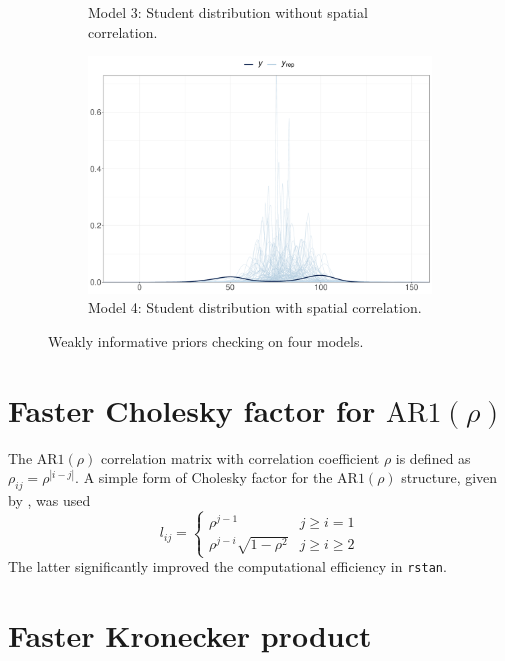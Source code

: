 \documentclass[a4paper]{article}   	%
\newcommand{\rstan}{\texttt{rstan}}
\newcommand{\AR}{\mathrm{AR}1}
\begin{document}
\begin{figure}[!htp]
\begin{subfigure}[t]{0.45\textwidth}
			\caption{Model 3: Student distribution without spatial correlation.}
		\end{subfigure}
		\begin{subfigure}[t]{0.45\textwidth}		
			\includegraphics[width=\linewidth]{Images/prior_STRand}
			\caption{Model 4: Student distribution with spatial correlation.}
		\end{subfigure}
		\caption{Weakly informative priors checking on four models. }\label{fig:priorcheck4models}
	\end{figure}
	
	
	\section{Faster Cholesky factor for $\AR(\rho)$}\label{sec:fastar1}
	
	The $\AR(\rho)$ correlation matrix with correlation coefficient $\rho$ is defined as $\rho_{ij} = \rho^{|i-j|}$. A simple form of Cholesky factor for the $\AR(\rho)$ structure, given by \textcite{Madar2015Direct}, was used 
	\begin{equation}
		l_{ij} = \begin{cases}
			\rho^{j-1} & j\geq i =1 \\
			\rho^{j-i} \sqrt{1-\rho^2} & j\geq i \geq2
		\end{cases}
	\end{equation}
	The latter significantly improved the computational efficiency in \rstan. 
	
	\section{Faster Kronecker product}\label{sec:kronec}
	
\end{document}
